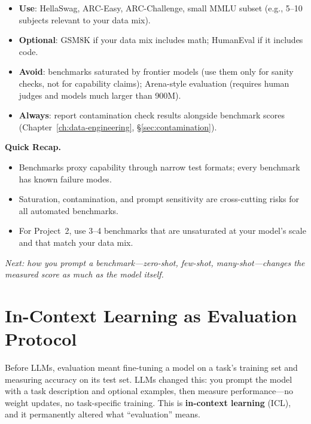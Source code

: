 \begin{tcolorbox}[colback=orange!5, colframe=orange!60, title=\textbf{For Project~2: Which Benchmarks to Use}]
\begin{itemize}[nosep]
  \item \textbf{Use}: HellaSwag, ARC-Easy, ARC-Challenge, small MMLU subset (e.g., 5--10 subjects relevant to your data mix).
  \item \textbf{Optional}: GSM8K if your data mix includes math; HumanEval if it includes code.
  \item \textbf{Avoid}: benchmarks saturated by frontier models (use them only for sanity checks, not for capability claims); Arena-style evaluation (requires human judges and models much larger than 900M).
  \item \textbf{Always}: report contamination check results alongside benchmark scores (Chapter~\ref{ch:data-engineering}, \S\ref{sec:contamination}).
\end{itemize}
\end{tcolorbox}

\begin{quickrecap}
\textbf{Quick Recap.}
\begin{itemize}[nosep,leftmargin=1.5em]
  \item Benchmarks proxy capability through narrow test formats; every benchmark has known failure modes.
  \item Saturation, contamination, and prompt sensitivity are cross-cutting risks for all automated benchmarks.
  \item For Project~2, use 3--4 benchmarks that are unsaturated at your model's scale and that match your data mix.
\end{itemize}
\textit{Next: how you prompt a benchmark---zero-shot, few-shot, many-shot---changes the measured score as much as the model itself.}
\end{quickrecap}


\section{In-Context Learning as Evaluation Protocol}
\label{sec:icl}

Before LLMs, evaluation meant fine-tuning a model on a task's training set and measuring accuracy on its test set. LLMs changed this: you prompt the model with a task description and optional examples, then measure performance---no weight updates, no task-specific training. This is \textbf{in-context learning} (ICL), and it permanently altered what ``evaluation'' means.

